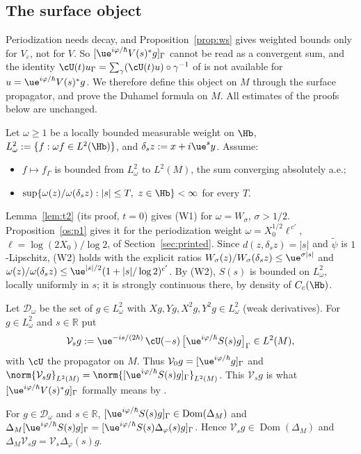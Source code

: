 \subsection{The surface object}\label{subsec:dd-surf}

Periodization needs decay, and Proposition~\ref{prop:ws} gives weighted bounds only for $V_\varepsilon$, not for $V$. So $[\ue^{i\varphi/\hbar}V(s)^*g]_\Gamma$ cannot be read as a convergent sum, and the identity $\cU(t)u_\Gamma=\sum_\gamma(\cU(t)u)\circ\gamma^{-1}$ of \cite{S} is not available for $u=\ue^{i\varphi/\hbar}V(s)^*g$. We therefore define this object on $M$ through the surface propagator, and prove the Duhamel formula on $M$. All estimates of the proofs below are unchanged.

Let $\omega\ge1$ be a locally bounded measurable weight on $\Hb$, $L^2_\omega:=\{f:\omega f\in L^2(\Hb)\}$, and $\delta_sz:=x+i\ue^sy$. Assume:
\begin{itemize}
\item[(W1)] $f\mapsto f_\Gamma$ is bounded from $L^2_\omega$ to $L^2(M)$, the sum converging absolutely a.e.;
\item[(W2)] $\sup\{\omega(z)/\omega(\delta_sz):|s|\le T,\ z\in\Hb\}<\infty$ for every $T$.
\end{itemize}
Lemma~\ref{lem:t2} (its proof, $t=0$) gives (W1) for $\omega=W_\sigma$, $\sigma>1/2$. Proposition~\ref{os:p1} gives it for the periodization weight $\omega=X_0^{1/2}\ell^{\,c'}$, $\ell=\log(2X_0)/\log2$, of Section~\ref{sec:printed}. Since $d(z,\delta_sz)=|s|$ and $\tilde\psi$ is $1$-Lipschitz, (W2) holds with the explicit ratios $W_\sigma(z)/W_\sigma(\delta_sz)\le\ue^{\sigma|s|}$ and $\omega(z)/\omega(\delta_sz)\le\ue^{|s|/2}(1+|s|/\log 2)^{c'}$. By (W2), $S(s)$ is bounded on $L^2_\omega$, locally uniformly in $s$; it is strongly continuous there, by density of $C_c(\Hb)$.

Let $\mathcal D_\omega$ be the set of $g\in L^2_\omega$ with $Xg,Yg,X^2g,Y^2g\in L^2_\omega$ (weak derivatives). For $g\in L^2_\omega$ and $s\in\mathbb R$ put
\[
\mathcal V_sg:=\ue^{-is/(2\hbar)}\,\cU(-s)\,\bigl[\ue^{i\varphi/\hbar}S(s)g\bigr]_\Gamma\in L^2(M),
\]
with $\cU$ the propagator on $M$. Thus $\mathcal V_0g=[\ue^{i\varphi/\hbar}g]_\Gamma$ and $\norm{\mathcal V_sg}_{L^2(M)}=\norm{[\ue^{i\varphi/\hbar}S(s)g]_\Gamma}_{L^2(M)}$. This $\mathcal V_sg$ is what $[\ue^{i\varphi/\hbar}V(s)^*g]_\Gamma$ formally means by \cite[(1.23)]{S}.

\begin{lemma}\label{lem:surf-lap}
For $g\in\mathcal D_\omega$ and $s\in\mathbb R$, $[\ue^{i\varphi/\hbar}S(s)g]_\Gamma\in\operatorname{Dom}(\Delta_M)$ and $\Delta_M[\ue^{i\varphi/\hbar}S(s)g]_\Gamma=[\ue^{i\varphi/\hbar}S(s)\Delta_\varphi(s)g]_\Gamma$. Hence $\mathcal V_sg\in\operatorname{Dom}(\Delta_M)$ and $\Delta_M\mathcal V_sg=\mathcal V_s\Delta_\varphi(s)g$.
\end{lemma}

